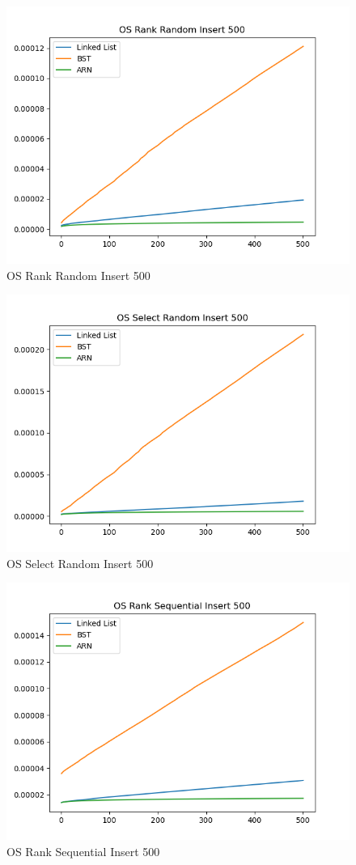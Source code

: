 \documentclass[11pt]{article}
\begin{document}
 \begin{figure}[H]
  \centering
  \includegraphics[width=0.8\linewidth]{Images/500/OS Rank Random Insert 500.png}
  \caption{OS Rank Random Insert 500 }
  \label{fig:OS Rank Random Insert 500}
\end{figure}
 \begin{figure}[H]
  \centering
  \includegraphics[width=0.8\linewidth]{Images/500/OS Select Random Insert 500.png}
  \caption{OS Select Random Insert 500 }
  \label{fig:OS Select Random Insert 500}
\end{figure}
 \begin{figure}[H]
  \centering
  \includegraphics[width=0.8\linewidth]{Images/500/OS Rank Sequential Insert 500.png}
  \caption{OS Rank Sequential Insert 500 }
  \label{fig:OS Rank Sequential Insert 500}
\end{figure}
\end{document}
